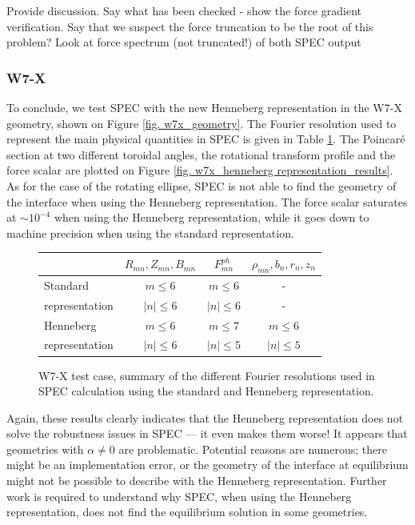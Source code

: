 \documentclass[my_thesis.tex]{subfiles}
\begin{document}
{\color{red} Provide discussion. Say what has been checked - show the force gradient verification. Say that we suspect the force truncation to be the root of this problem? Look at force spectrum (not truncated!) of both SPEC output}

\subsubsection{W7-X}
To conclude, we test SPEC with the new Henneberg representation in the W7-X geometry, shown on Figure \ref{fig. w7x_geometry}. The Fourier resolution used to represent the main physical quantities in SPEC is given in Table \ref{tab. w7x res}. The Poincar\'e section at two different toroidal angles, the rotational transform profile and the force scalar are plotted on Figure \ref{fig. w7x_henneberg representation_results}. As for the case of the rotating ellipse, SPEC is not able to find the geometry of the interface when using the Henneberg representation. The force scalar saturates at $\sim 10^{-4}$ when using the Henneberg representation, while it goes down to machine precision when using the standard representation.  


\begin{figure}
	\centering
	\begin{tabular}{l|c|c|c|}
		    & $R_{mn},Z_{mn},B_{mn}$ & $F^{ph}_{mn}$ & $\rho_{mn},b_n,r_n,z_n$ \\
		\hline
		Standard &  $m\leq 6$ & $m\leq 6$ & - \\
		representation	& $|n|\leq 6$ & $|n|\leq 6$ & - \\
		\hline
		Henneberg & $m\leq 6$ & $m\leq 7$ & $m\leq 6$\\
		representation & $|n|\leq 6$ & $|n|\leq 5$ & $|n|\leq 5$
	\end{tabular}
	\caption{W7-X test case, summary of the different Fourier resolutions used in SPEC calculation using the standard and Henneberg representation.}
	\label{tab. w7x res}
\end{figure}

Again, these results clearly indicates that the Henneberg representation does not solve the robustness issues in SPEC --- it even makes them worse! It appears that geometries with $\alpha\neq 0$ are problematic. Potential reasons are numerous; there might be an implementation error, or the geometry of the interface at equilibrium might not be possible to describe with the Henneberg representation. Further work is required to understand why SPEC, when using the Henneberg representation, does not find the equilibrium solution in some geometries. 
\end{document}
